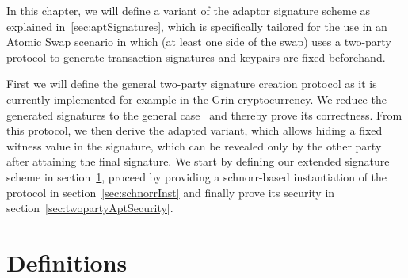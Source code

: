 In this chapter, we will define a variant of the adaptor signature scheme as explained in~\ref{sec:aptSignatures},
which is specifically tailored for the use in an Atomic Swap scenario in which (at least one side of the swap) uses a two-party protocol to generate transaction signatures and keypairs are fixed beforehand. 

First we will define the general two-party signature creation protocol as it is currently implemented for example in the Grin cryptocurrency.
We reduce the generated signatures to the general case~\cite{schnorr1989efficient} and thereby prove its correctness.
From this protocol, we then derive the adapted variant, which allows hiding a fixed witness
value in the signature, which can be revealed only by the other party after attaining the final signature.
We start by defining our extended signature scheme in section~\ref{sec:definitions}, proceed by providing a schnorr-based instantiation of the protocol in section~\ref{sec:schnorrInst} and finally prove its security in section~\ref{sec:twopartyAptSecurity}.

\section{Definitions}\label{sec:definitions}

